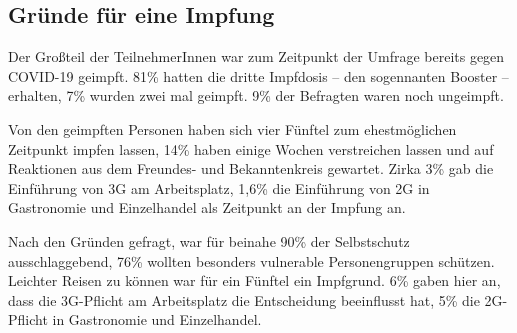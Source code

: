 \subsection{Gründe für eine Impfung}

Der Großteil der TeilnehmerInnen war zum Zeitpunkt der Umfrage bereits gegen COVID-19 geimpft. 81\% hatten die dritte Impfdosis -- den sogennanten Booster -- erhalten, 7\% wurden zwei mal geimpft. 9\% der Befragten waren noch ungeimpft.

Von den geimpften Personen haben sich vier Fünftel zum ehestmöglichen Zeitpunkt impfen lassen, 14\% haben einige Wochen verstreichen lassen und auf Reaktionen aus dem Freundes- und Bekanntenkreis gewartet. Zirka 3\% gab die Einführung von 3G am Arbeitsplatz, 1,6\% die Einführung von 2G in Gastronomie und Einzelhandel als Zeitpunkt an der Impfung an.

Nach den Gründen gefragt, war für beinahe 90\% der Selbstschutz ausschlaggebend, 76\% wollten besonders vulnerable Personengruppen schützen.  Leichter Reisen zu können war für ein Fünftel ein Impfgrund. 6\% gaben hier an, dass die 3G-Pflicht am Arbeitsplatz die Entscheidung beeinflusst hat, 5\% die 2G-Pflicht in Gastronomie und Einzelhandel.

